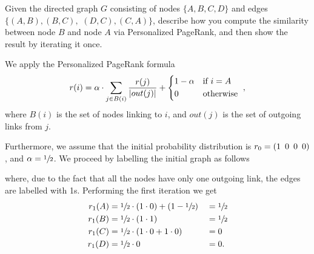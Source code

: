 \exercise

Given the directed graph $G$ consisting of nodes $\{A, B, C, D\}$ and edges 
$\{(A,B), (B,C),$ $ (D,C), (C,A)\}$, describe how you compute the similarity
between node $B$ and node $A$ via Personalized PageRank, and then show the
result by iterating it once.

\solution

We apply the Personalized PageRank formula
%
\begin{equation*}
  r(i) = \alpha\cdot\sum_{j\in B(i)} \frac{r(j)}{|out(j)|} +
  \begin{cases*}
    1-\alpha & if $i=A$ \\
    0        & otherwise
  \end{cases*},
\end{equation*}
%
where $B(i)$ is the set of nodes linking to $i$, and $out(j)$ is the set of
outgoing links from $j$.

Furthermore, we assume that the initial probability distribution is
$r_0=(1 \enskip 0 \enskip 0 \enskip 0)$, and $\alpha=\sfrac{1}{2}$. We proceed
by labelling the initial graph as follows
%
\begin{center}
\end{center}
%
where, due to the fact that all the nodes have only one outgoing link, the edges
are labelled with 1s. Performing the first iteration we get
%
\begin{alignat*}{3}
  r_1(A) &= \sfrac{1}{2} \cdot (1\cdot0) + (1-\sfrac{1}{2}) &&= \sfrac{1}{2} \\
  r_1(B) &= \sfrac{1}{2} \cdot (1\cdot1)                    &&= \sfrac{1}{2} \\
  r_1(C) &= \sfrac{1}{2} \cdot (1\cdot0+1\cdot0)            && = 0 \\
  r_1(D) &= \sfrac{1}{2} \cdot 0                            &&= 0.
\end{alignat*}

